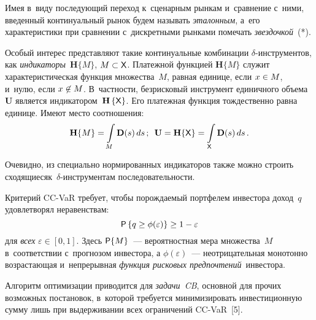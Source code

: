 \begin{multicols}{2}
  Имея в~виду последующий переход к~сценарным рынкам и~сравнение с~ними, 
введенный континуальный рынок будем называть \textit{эталонным}, а~его 
характеристики при сравнении с~дискретными рынками помечать 
\textit{звездочкой}~(*). 
  
  Особый интерес представляют такие континуальные комбинации  
$\delta$-ин\-стру\-мен\-тов, как \textit{индикаторы}~$\mathbf{H}\{M\}$, $M\hm\subset 
{\sf X}$. Платежной функцией $\mathbf{H}\{M\}$ служит характеристическая функция 
множества~$M$, равная единице, если $x\hm\in M$, и~нулю, если $x\hm\not\in 
M$. В~частности, безрисковый инструмент единичного объема~$\mathbf{U}$ является 
индикатором~$\mathbf{H}\left\{{\sf X}\right\}$. Его платежная функция тождественно равна 
единице. Имеют место соотношения:
  $$
  \mathbf{H}\{M\} =\int\limits_M \mathbf{D}(s)\,ds\,;\enskip  
  \mathbf{U}=\mathbf{H}\{{\sf X}\}=\int\limits_{\sf X} 
\mathbf{D}(s)\,ds\,.
  $$
  
  Очевидно, из специально нормированных индикаторов также можно строить 
сходящиеся\linebreak к~$\delta$-ин\-стру\-мен\-там последовательности.
  
  Критерий CC-VaR требует, чтобы порождаемый портфелем инвестора доход~$q$ 
удовлетворял неравенствам: 
  \begin{equation}
  {\sf P}\left\{ q\geq \phi(\varepsilon)\right\} \geq 1-\varepsilon
  \label{e1-ag}
  \end{equation}
  для \textit{всех} $\varepsilon \in [0, 1]$.   
  Здесь ${\sf P}\{M\}$~--- вероятностная мера множества~$M$ в~соответствии 
с~прогнозом инвестора, а $\phi(\varepsilon)$~--- неотрицательная  
мо\-но\-тон\-но воз\-рас\-та\-ющая и~непрерывная \textit{функция рисковых 
предпочтений}\ инвестора. 
  
  Алгоритм оптимизации приводится для \textit{задачи~CB}, основной для 
прочих возможных постановок, в~которой требуется минимизировать 
инвестиционную сумму лишь при выдерживании всех ограничений  
CC-VaR~[5]. 
  

\end{multicols}
